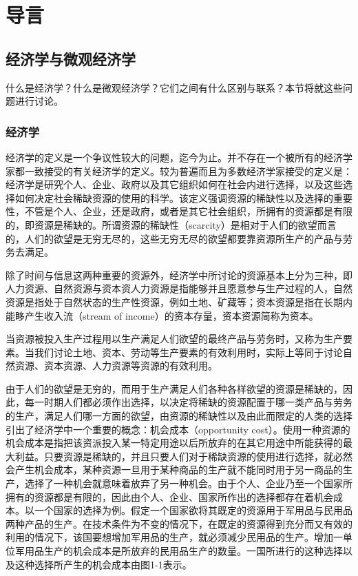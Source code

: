 \chapter[导言]{导言}

\section{经济学与微观经济学}

什么是经济学？什么是微观经济学？它们之间有什么区别与联系？本节将就这些问题进行讨论。

\subsection{经济学}

经济学的定义是一个争议性较大的问题，迄今为止。并不存在一个被所有的经济学家都一致接受的有关经济学的定义。较为普遍而且为多数经济学家接受的定义是：经济学是研究个人、企业、政府以及其它组织如何在社会内进行选择，以及这些选择如何决定社会稀缺资源的使用的科学。该定义强调资源的稀缺性以及选择的重要性，不管是个人、企业，还是政府，或者是其它社会组织，所拥有的资源都是有限的，即资源是稀缺的。所谓资源的稀缺性（scarcity）是相对于人们的欲望而言的，人们的欲望是无穷无尽的，这些无穷无尽的欲望都要靠资源所生产的产品与劳务去满足。

除了时间与信息这两种重要的资源外，经济学中所讨论的资源基本上分为三种，即人力资源、自然资源与资本资人力资源是指能够并且愿意参与生产过程的人，自然资源是指处于自然状态的生产性资源，例如土地、矿藏等；资本资源是指在长期内能眵产生收入流（stream of income）的资本存量，资本资源简称为资本。

当资源被投入生产过程用以生产满足人们欲望的最终产品与劳务时，又称为生产要素。当我们讨论土地、资本、劳动等生产要素的有效利用时，实际上等同于讨论自然资源、资本资源、人力资源等资源的有效利用。

由于人们的欲望是无穷的，而用于生产满足人们各种各样欲望的资源是稀缺的，因此，每一时期人们都必须作出选择，以决定将稀缺的资源配置于哪一类产品与劳务的生产，满足人们哪一方面的欲望，由资源的稀缺性以及由此而限定的人类的选择引出了经济学中一个重要的概念：机会成本（opportunity cost）。使用一种资源的机会成本是指把该资派投入某一特定用途以后所放弃的在其它用途中所能获得的最大利益。只要资源是稀缺的，并且只要人们对于稀缺资源的使用进行选择，就必然会产生机会成本，某种资源一旦用于某种商品的生产就不能同时用于另一商品的生产，选择了一种机会就意味着放弃了另一种机会。由于个人、企业乃至一个国家所拥有的资源都是有限的，因此由个人、企业、国家所作出的选择都存在着机会成本。以一个国家的选择为例。假定一个国家欲将其既定的资源用于军用品与民用品两种产品的生产。在技术条件为不变的情况下，在既定的资源得到充分而又有效的利用的情况下，该国要想增加军用品的生产，就必须减少民用品的生产。增加一单位军用品生产的机会成本是所放弃的民用品生产的数量。一国所进行的这种选择以及这种选择所产生的机会成本由图1-1表示。

